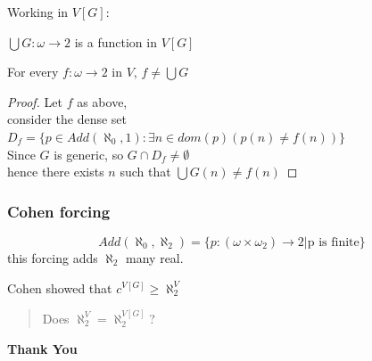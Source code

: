 \documentclass{beamer}
\begin{document}
\begin{frame}
Working in $V[G]$:
\begin{theorem}
$\bigcup G : \omega \longrightarrow 2$ is a function in $V[G]$
\end{theorem}
\pause
\begin{theorem}
For every $f:\omega \longrightarrow 2$ in $V$, $f \neq \bigcup G$
\end{theorem}
\pause
\begin{proof}
Let $f$ as above,\\
\pause
consider the dense set $D_f=\{p \in Add(\aleph_0, 1) \colon \exists n \in dom(p) (p(n) \neq f(n))\}$\\
\pause
Since $G$ is generic, so $G \cap D_f \neq \emptyset$\\
\pause
hence there exists $n$ such that $\bigcup G (n) \neq f(n)$
\end{proof}
\end{frame}
\begin{frame}
\frametitle{Cohen forcing}
$$Add(\aleph_0, \aleph_2)=\{p:(\omega \times \omega_2) \longrightarrow 2 | \text{p is finite}\}$$
this forcing adds $\aleph_2$ many real.\\
\begin{block}{}
Cohen showed that $c^{V[G]} \geq \aleph_2^{V}$
\end{block}
\begin{quotation}
Does $\aleph_2^V=\aleph_2^{V[G]}$?
\end{quotation}
\end{frame}
\begin{frame}
\begin{center}
\textbf{{\Huge Thank You}}
\end{center}
\end{frame}
\end{document}
